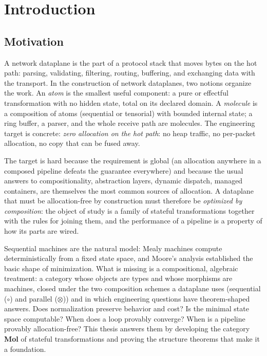 \chapter{Introduction}\label{ch:intro}

\section{Motivation}
\label{sec:motivation}

A network dataplane is the part of a protocol stack that moves bytes on the hot path: parsing, validating, filtering, routing, buffering, and exchanging data with the transport. In the construction of network dataplanes, two notions organize the work. An \emph{atom} is the smallest useful component: a pure or effectful transformation with no hidden state, total on its declared domain. A \emph{molecule} is a composition of atoms (sequential or tensorial) with bounded internal state; a ring buffer, a parser, and the whole receive path are molecules. The engineering target is concrete: \emph{zero allocation on the hot path}: no heap traffic, no per-packet allocation, no copy that can be fused away.

The target is hard because the requirement is global (an allocation anywhere in a composed pipeline defeats the guarantee everywhere) and because the usual answers to compositionality, abstraction layers, dynamic dispatch, managed containers, are themselves the most common sources of allocation. A dataplane that must be allocation-free by construction must therefore be \emph{optimized by composition}: the object of study is a family of stateful transformations together with the rules for joining them, and the performance of a pipeline is a property of how its parts are wired.

Sequential machines are the natural model: Mealy machines \citep{mealy} compute deterministically from a fixed state space, and Moore's analysis \citep{moore} established the basic shape of minimization. What is missing is a compositional, algebraic treatment: a category whose objects are types and whose morphisms are machines, closed under the two composition schemes a dataplane uses (sequential ($\circ$) and parallel ($\otimes$)) and in which engineering questions have theorem-shaped answers. Does normalization preserve behavior and cost? Is the minimal state space computable? When does a loop provably converge? When is a pipeline provably allocation-free? This thesis answers them by developing the category \textbf{Mol} of stateful transformations and proving the structure theorems that make it a foundation.

